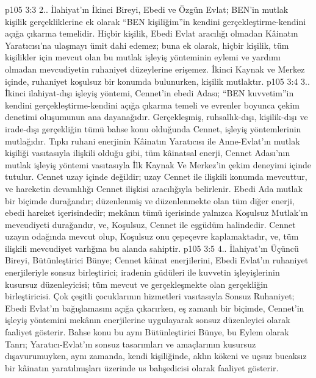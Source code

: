 \vs p105 3:3 2.\bibnobreakspace {}. İlahiyat’ın İkinci Bireyi, Ebedi ve Özgün Evlat; BEN’in mutlak kişilik gerçekliklerine ek olarak “BEN kişiliğim”in kendini gerçekleştirme\hyp{}kendini açığa çıkarma temelidir. Hiçbir kişilik, Ebedi Evlat aracılığı olmadan Kâinatın Yaratıcısı’na ulaşmayı ümit dahi edemez; buna ek olarak, hiçbir kişilik, tüm kişilikler için mevcut olan bu mutlak işleyiş yönteminin eylemi ve yardımı olmadan mevcudiyetin ruhaniyet düzeylerine erişemez. İkinci Kaynak ve Merkez içinde, ruhaniyet koşulsuz bir konumda bulunurken, kişilik mutlaktır.
\vs p105 3:4 3.\bibnobreakspace {}. İkinci ilahiyat\hyp{}dışı işleyiş yöntemi, Cennet’in ebedi Adası; “BEN kuvvetim”in kendini gerçekleştirme\hyp{}kendini açığa çıkarma temeli ve evrenler boyunca çekim denetimi oluşumunun ana dayanağıdır. Gerçekleşmiş, ruhsallık\hyp{}dışı, kişilik\hyp{}dışı ve irade\hyp{}dışı gerçekliğin tümü bahse konu olduğunda Cennet, işleyiş yöntemlerinin mutlağıdır. Tıpkı ruhani enerjinin Kâinatın Yaratıcısı ile Anne\hyp{}Evlat’ın mutlak kişiliği vasıtasıyla ilişkili olduğu gibi, tüm kâinatsal enerji, Cennet Adası’nın mutlak işleyiş yöntemi vasıtasıyla İlk Kaynak Ve Merkez’in çekim deneyimi içinde tutulur. Cennet uzay içinde değildir; uzay Cennet ile ilişkili konumda mevcuttur, ve hareketin devamlılığı Cennet ilişkisi aracılığıyla belirlenir. Ebedi Ada mutlak bir biçimde durağandır; düzenlenmiş ve düzenlenmekte olan tüm diğer enerji, ebedi hareket içerisindedir; mekânın tümü içerisinde yalnızca Koşulsuz Mutlak’ın mevcudiyeti durağandır, ve, Koşulsuz, Cennet ile eşgüdüm halindedir. Cennet uzayın odağında mevcut olup, Koşulsuz onu çepeçevre kaplamaktadır, ve, tüm ilişkili mevcudiyet varlığına bu alanda sahiptir.
\vs p105 3:5 4.. İlahiyat’ın Üçüncü Bireyi, Bütünleştirici Bünye; Cennet kâinat enerjilerini, Ebedi Evlat’ın ruhaniyet enerjileriyle sonsuz birleştirici; iradenin güdüleri ile kuvvetin işleyişlerinin kusursuz düzenleyicisi; tüm mevcut ve gerçekleşmekte olan gerçekliğin birleştiricisi. Çok çeşitli çocuklarının hizmetleri vasıtasıyla Sonsuz Ruhaniyet; Ebedi Evlat’ın bağışlamasını açığa çıkarırken, eş zamanlı bir biçimde, Cennet’in işleyiş yöntemini mekânın enerjilerine uygulayarak sonsuz düzenleyici olarak faaliyet gösterir. Bahse konu bu aynı Bütünleştirici Bünye, bu Eylem olarak Tanrı; Yaratıcı\hyp{}Evlat’ın sonsuz tasarımları ve amaçlarının kusursuz dışavurumuyken, aynı zamanda, kendi kişiliğinde, aklın kökeni ve uçsuz bucaksız bir kâinatın yaratılmışları üzerinde us bahşedicisi olarak faaliyet gösterir.
